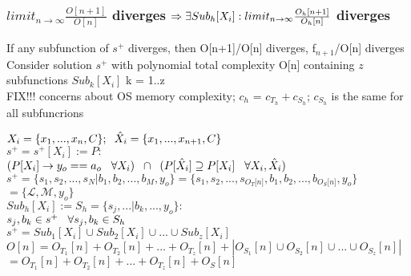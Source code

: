 \documentclass[11pt]{article}
\begin{document}
\subsubsection{$limit_{n \rightarrow \infty} \frac{O[n+1]}{O[n]}$  diverges $\Rightarrow\\ \exists Sub_h[X_i]: limit_{n \rightarrow \infty} \frac{O_h[n+1]}{O_h[n]}$ diverges}
If any subfunction of $s^+$ diverges, then O[n+1]/O[n] diverges, f$_{n+1}$/O[n] diverges
Consider solution $s^+$ with polynomial total complexity O[n] containing $z$ subfunctions $Sub_k[X_i]$ k = 1..z\\
FIX!!! concerns about OS memory complexity; $c_h$ = $c_{T_h} + c_{S_h}$; $c_{S_h}$ is the same for all subfuncrions
\vspace{1mm}
\begin{center}
$
X_i = \{x_1,...,x_n,C\}; \hspace{2mm} \hat{X}_i = \{x_1,...,x_{n+1},C\}
$
\\ \vspace{2mm}
$
s^+ = s^+[X_i] := P :
$
\\ \vspace{2mm}
$
(P \lbrack X_i \rbrack \rightarrow y_{o} == a_{o} \hspace{3mm} \forall X_i) \hspace{2mm} \cap \hspace{2mm} (P[\hat{X}_i] \supseteq P[X_i] \hspace{3mm} \forall X_i,\hat{X}_i)
$
\\ \vspace{4mm}
$
s^+ = \{ s_1,s_2,...,s_N|b_1,b_2,...,b_M,y_o\} = \{ s_1,s_2,...,s_{O_T \lbrack n \rbrack }, b_1, b_2,...,b_{O_S \lbrack n \rbrack},y_o \}
$
\\ \vspace{2mm}
$
= \{ \mathcal{L},\mathcal{M},y_o\}
$
\\ \vspace{6mm}
$
Sub_h[X_i] := S_h = \{s_j,...|b_k,...,y_o\}:
$
\\ \vspace{2mm}
$
s_j, b_k \in s^+ \hspace{3mm} \forall s_j,b_k \in S_h
$
\\ \vspace{6mm}
$
s^+ = Sub_1[X_i] \cup Sub_2[X_i] \cup ... \cup Sub_z[X_i]
$
\\ \vspace{6mm}
$
O[n] = O_{T_1}[n] + O_{T_2}[n] + ... + O_{T_z}[n] + |O_{S_1}[n] \cup O_{S_2}[n] \cup  ... \cup O_{S_z}[n]|
$
\\ \vspace{2mm}
$
= O_{T_1}[n] + O_{T_2}[n] + ... + O_{T_z}[n] + O_S[n]
$
\end{center}
\end{document}
